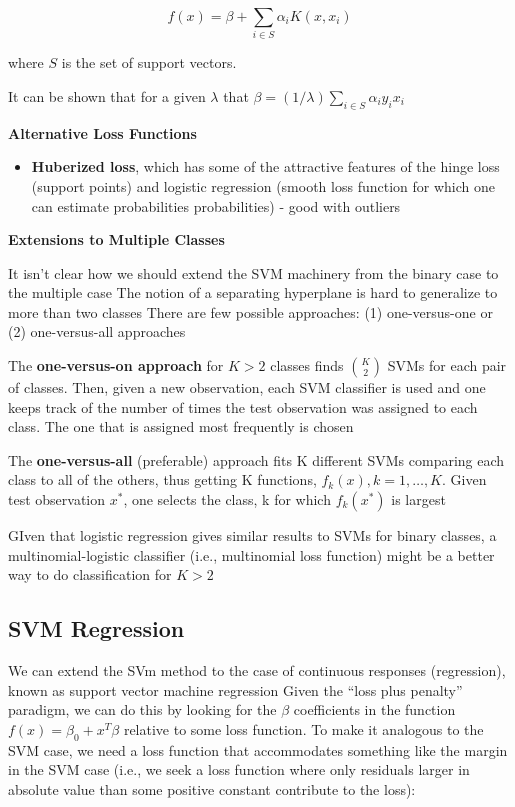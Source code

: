 \documentclass[
]{book}
\providecommand{\tightlist}{%
  \setlength{\itemsep}{0pt}\setlength{\parskip}{0pt}}
\begin{document}
\[
f(x) = \beta + \sum_{i \in S} \alpha_i K(x, x_i)
\]

where \(S\) is the set of support vectors.

It can be shown that for a given \(\lambda\) that \(\beta = (1/\lambda) \sum_{i \in S} \alpha_i y_i x_i\)

\textbf{Alternative Loss Functions}

\begin{itemize}
\tightlist
\item
  \textbf{Huberized loss}, which has some of the attractive features of the hinge loss (support points) and logistic regression (smooth loss function for which one can estimate probabilities probabilities) - good with outliers
\end{itemize}

\textbf{Extensions to Multiple Classes}

It isn't clear how we should extend the SVM machinery from the binary case to the multiple case The notion of a separating hyperplane is hard to generalize to more than two classes There are few possible approaches: (1) one-versus-one or (2) one-versus-all approaches

The \textbf{one-versus-on approach} for \(K > 2\) classes finds \(\binom{K}{2}\) SVMs for each pair of classes. Then, given a new observation, each SVM classifier is used and one keeps track of the number of times the test observation was assigned to each class. The one that is assigned most frequently is chosen

The \textbf{one-versus-all} (preferable) approach fits K different SVMs comparing each class to all of the others, thus getting K functions, \(f_k(x), k = 1, \dots, K\). Given test observation \(x^*\), one selects the class, k for which \(f_k(x^*)\) is largest

GIven that logistic regression gives similar results to SVMs for binary classes, a multinomial-logistic classifier (i.e., multinomial loss function) might be a better way to do classification for \(K>2\)

\hypertarget{svm-regression}{%
\subsection{SVM Regression}\label{svm-regression}}

We can extend the SVm method to the case of continuous responses (regression), known as support vector machine regression Given the ``loss plus penalty'' paradigm, we can do this by looking for the \(\beta\) coefficients in the function \(f(x) = \beta_0 + x^T \beta\) relative to some loss function. To make it analogous to the SVM case, we need a loss function that accommodates something like the margin in the SVM case (i.e., we seek a loss function where only residuals larger in absolute value than some positive constant contribute to the loss):
\end{document}
